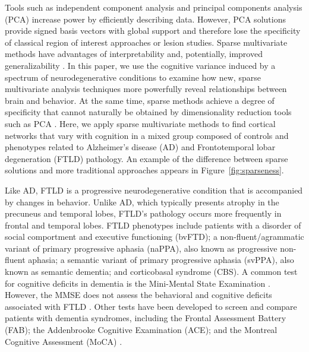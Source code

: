 \documentclass[preprint,authoryear,12pt]{elsarticle}
\begin{document}
Tools such as independent component analysis and principal components analysis (PCA) \citet{mansfield_analytic_1977,comon_independent_1994,yeung_principal_2001,Borroni2012,Shamy2011} increase power by efficiently describing data.  However, PCA solutions provide signed basis vectors with global support and therefore lose the specificity of classical region of interest approaches or lesion studies.  Sparse multivariate methods have advantages of interpretability \citet{lee_learning_1999,Suykens2002} and, potentially, improved generalizability \citet{elad_why_2006,Zhang2008,Yamashita2008,Ryali2010,zibulevsky_l1-l2_2010}.  In this paper, we use the cognitive variance induced by a spectrum of neurodegenerative conditions to examine how new, sparse multivariate analysis techniques more powerfully reveal relationships between brain and behavior.  At the same time, sparse methods achieve a degree of specificity that cannot naturally be obtained by dimensionality reduction tools such as PCA \citet{lee_learning_1999}.  Here, we apply sparse multivariate methods to find cortical networks that vary with cognition in a mixed group composed of controls and phenotypes related to Alzheimer's disease (AD) and Frontotemporal lobar degeneration (FTLD) pathology.  An example of the difference between sparse solutions and more traditional approaches appears in Figure~\ref{fig:sparseness}.

Like AD, FTLD is a progressive neurodegenerative condition that is accompanied by changes in behavior.  Unlike AD, which typically presents atrophy in the precuneus and temporal lobes, FTLD's pathology occurs more frequently in frontal and temporal lobes\citet{Rabinovici2007,Whitwell2007d}.  FTLD phenotypes include patients with a disorder of social comportment and executive functioning (bvFTD); a non-fluent/agrammatic variant of primary progressive aphasia (naPPA), also known as progressive non-fluent aphasia; a semantic variant of primary progressive aphasia (svPPA), also known as semantic dementia; and corticobasal syndrome (CBS).  A common test for cognitive deficits in dementia is the Mini-Mental State Examination \citet{Hill1995}. However, the MMSE does not assess the behavioral and cognitive deficits associated with FTLD \citet{Hutchinson2007}.  Other tests have been developed to screen and compare patients with dementia syndromes, including the Frontal Assessment Battery \citet{Dubois2000} (FAB); the Addenbrooke Cognitive Examination \citet{Galton2005} (ACE); and the Montreal Cognitive Assessment (MoCA) \citet{Nasreddine2005}.
\end{document}
